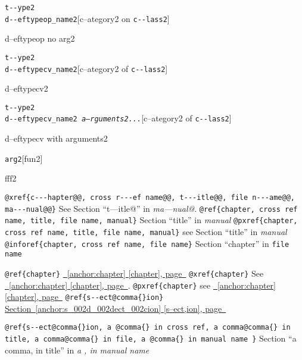 \documentclass{book}
\begin{document}
\begin{titlepage}
\noindent\texttt{t{-}{-}ype2\leavevmode{}\\d{-}{-}eftypeop\_name2}\hfill[c--ategory2 on \texttt{c{-}{-}lass2}]



%
d--eftypeop no arg2

\noindent\texttt{t{-}{-}ype2\leavevmode{}\\d{-}{-}eftypecv\_name2}\hfill[c--ategory2 of \texttt{c{-}{-}lass2}]



%
d--eftypecv2

\noindent\texttt{t{-}{-}ype2\leavevmode{}\\d{-}{-}eftypecv\_name2 \bgroup{}\normalfont{}\textsl{a--rguments2...}\egroup{}}\hfill[c--ategory2 of \texttt{c{-}{-}lass2}]



%
d--eftypecv with arguments2

\noindent\texttt{arg2}\hfill[fun2]



%
fff2


\texttt{@xref\{c{-}{-}{-}hapter@@, cross r{-}{-}{-}ef name@@, t{-}{-}{-}itle@@, file n{-}{-}{-}ame@@, ma{-}{-}{-}nual@@\}} See Section ``t---itle@'' in \textsl{ma---nual@}.
\texttt{@ref\{chapter, cross ref name, title, file name, manual\}} Section ``title'' in \textsl{manual}
\texttt{@pxref\{chapter, cross ref name, title, file name, manual\}} see Section ``title'' in \textsl{manual}
\texttt{@inforef\{chapter, cross ref name, file name\}} Section ``chapter'' in \texttt{file name}

\texttt{@ref\{chapter\}} \hyperref[anchor:chapter]{\chaptername~\ref*{anchor:chapter} [chapter], page~\pageref*{anchor:chapter}}
\texttt{@xref\{chapter\}} See \hyperref[anchor:chapter]{\chaptername~\ref*{anchor:chapter} [chapter], page~\pageref*{anchor:chapter}}.
\texttt{@pxref\{chapter\}} see \hyperref[anchor:chapter]{\chaptername~\ref*{anchor:chapter} [chapter], page~\pageref*{anchor:chapter}}
\texttt{@ref\{s{-}{-}ect@comma\{\}ion\}} \hyperref[anchor:s_002d_002dect_002cion]{Section~\ref*{anchor:s_002d_002dect_002cion} [s--ect,ion], page~\pageref*{anchor:s_002d_002dect_002cion}}

\texttt{@ref\{s{-}{-}ect@comma\{\}ion, a @comma\{\} in cross
ref, a comma@comma\{\} in title, a comma@comma\{\} in file, a @comma\{\} in manual name \}}
Section ``a comma, in title'' in \textsl{a , in manual name}


\end{titlepage}
\end{document}
